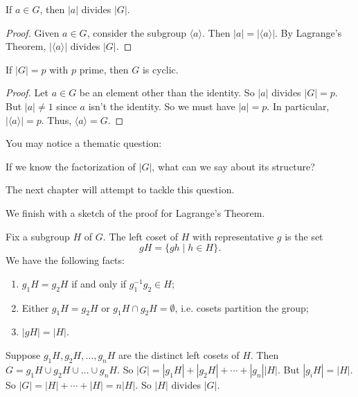 \begin{corollary}
	If $a\in G$, then $|a|$ divides $|G|$.
\end{corollary}

\begin{proof}
	Given $a\in G$, consider the subgroup $\langle a\rangle$. Then $|a|=|\langle a\rangle|$. By Lagrange's Theorem, $|\langle a\rangle|$ divides $|G|$.
\end{proof}

\begin{corollary}
	If $|G|=p$ with $p$ prime, then $G$ is cyclic.
\end{corollary}

\begin{proof}
	Let $a\in G$ be an element other than the identity. So $|a|$ divides $|G|=p$. But $|a|\neq 1$ since $a$ isn't the identity. So we must have $|a|=p$. In particular, $|\langle a\rangle|=p$. Thus, $\langle a\rangle =G$.
\end{proof}

You may notice a thematic question: 

\begin{rmkbox}
	If we know the factorization of $|G|$, what can we say about its structure?
\end{rmkbox}

The next chapter will attempt to tackle this question.

We finish with a sketch of the proof for Lagrange's Theorem.

Fix a subgroup $H$ of $G$. The left coset of $H$ with representative $g$ is the set
$$gH=\{gh\mid h\in H\}.$$
We have the following facts:
\begin{enumerate}
	\item $g_1H=g_2H$ if and only if $g_1^{-1}g_2\in H$;
	\item Either $g_1H=g_2H$ or $g_1H\cap g_2H=\emptyset$, i.e. cosets partition the group;
	\item $|gH|=|H|$.
\end{enumerate}

Suppose $g_1H,g_2H,\hdots,g_nH$ are the distinct left cosets of $H$. Then $G=g_1H\cup g_2H\cup\hdots\cup g_nH$. So $|G|=|g_1H|+|g_2H|+\cdots +|g_n||H|$. But $|g_iH|=|H|$. So $|G|=|H|+\cdots+|H|=n|H|$. So $|H|$ divides $|G|$.